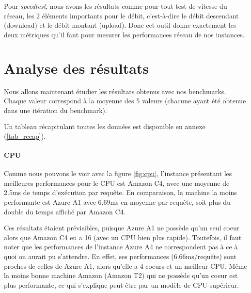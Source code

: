 Pour \textit{speedtest}, nous avons les résultats comme pour tout test de vitesse du réseau, les 2 éléments importants pour le débit, c’est-à-dire le débit descendant (download) et le débit montant (upload). Donc cet outil donne exactement les deux métriques qu’il faut pour mesurer les performances réseau de nos instances.

\section{Analyse des résultats}

Nous allons maintenant étudier les résultats obtenus avec nos benchmarks. Chaque valeur correspond à la moyenne des 5 valeurs (chacune ayant été obtenue dans une itération du benchmark).

Un tableau récapitulant toutes les données est disponible en annexe (\ref{tab_recap}).

\paragraph{CPU}

Comme nous pouvons le voir avec la figure \ref{fig:cpu}, l'instance présentant les meilleures performances pour le CPU est Amazon C4, avec une moyenne de 2.5ms de temps d'exécution par requête. En comparaison, la machine la moins performante est Azure A1 avec 6.69ms en moyenne par requête, soit plus du double du temps affiché par Amazon C4. 

Ces résultats étaient prévisibles, puisque Azure A1 ne possède qu'un seul coeur alors que Amazon C4 en a 16 (avec un CPU bien plus rapide). Toutefois, il faut noter que les performances de l'instance Azure A4 ne correspondent pas à ce à quoi on aurait pu s'attendre. En effet, ses performances (6.66ms/requête) sont proches de celles de Azure A1, alors qu'elle a 4 coeurs et un meilleur CPU. Même la moins bonne machine Amazon (Amazon T2) qui ne possède qu'un coeur est plus performante, ce qui s'explique peut-être par un modèle de CPU supérieur.

